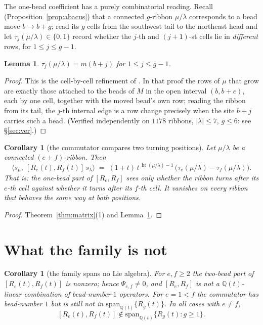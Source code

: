 \documentclass[11pt]{article}
\newtheorem{lemma}[theorem]{Lemma}
\newtheorem{corollary}[theorem]{Corollary}
\theoremstyle{definition}
\newcommand{\hgt}{\operatorname{ht}}          %
\newcommand{\Q}{\mathbb{Q}}
\begin{document}
The one-bead coefficient has a purely combinatorial reading.  Recall
(Proposition~\ref{prop:abacus}) that a connected $g$-ribbon $\mu/\lambda$ corresponds to a
bead move $b\to b+g$; read its $g$ cells from the southwest tail to the northeast head and
let $\tau_j(\mu/\lambda)\in\{0,1\}$ record whether the $j$-th and $(j{+}1)$-st cells lie
in \emph{different} rows, for $1\le j\le g-1$.

\begin{lemma}\label{lem:turn}
$\tau_j(\mu/\lambda)=m(b+j)$ for $1\le j\le g-1$.
\end{lemma}

\begin{proof}
This is the cell-by-cell refinement of \cite[Lem.~2.4]{Clio0906}.  In that proof the rows
of $\mu$ that grow are exactly those attached to the beads of $M$ in the open interval
$(b,b+e)$, each by one cell, together with the moved bead's own row; reading the ribbon
from its tail, the $j$-th internal edge is a row change precisely when the site $b+j$
carries such a bead.  (Verified independently on $1178$ ribbons, $|\lambda|\le7$,
$g\le6$: see \S\ref{sec:ver}.)
\end{proof}

\begin{corollary}[the commutator compares two turning positions]\label{cor:turn}
Let $\mu/\lambda$ be a connected $(e{+}f)$-ribbon.  Then
\[
  \bigl\langle s_\mu,\ [R_e(t),R_f(t)]\,s_\lambda\bigr\rangle
  \;=\;(1+t)\,t^{\,\hgt(\mu/\lambda)-1}\,
        \bigl(\tau_e(\mu/\lambda)-\tau_f(\mu/\lambda)\bigr).
\]
That is: the one-bead part of $[R_e,R_f]$ sees only whether the ribbon \emph{turns} after
its $e$-th cell against whether it turns after its $f$-th cell.  It vanishes on every
ribbon that behaves the same way at both positions.
\end{corollary}

\begin{proof}
Theorem~\ref{thm:matrix}(1) and Lemma~\ref{lem:turn}.
\end{proof}

\section{What the family is not}

\begin{corollary}[the family spans no Lie algebra]\label{cor:noclose}
For $e,f\ge2$ the two-bead part of $[R_e(t),R_f(t)]$ is nonzero; hence
$\Psi_{e,f}\ne0$, and $[R_e,R_f]$ is not a $\Q(t)$-linear combination of bead-number-$1$
operators.  For $e=1<f$ the commutator has bead-number $1$ but is still not in
$\mathrm{span}_{\Q(t)}\{R_g(t)\}$.  In all cases with $e\ne f$,
\[
   [R_e(t),R_f(t)]\notin\mathrm{span}_{\Q(t)}\{R_g(t):g\ge1\}.
\]
\end{corollary}
\end{document}
